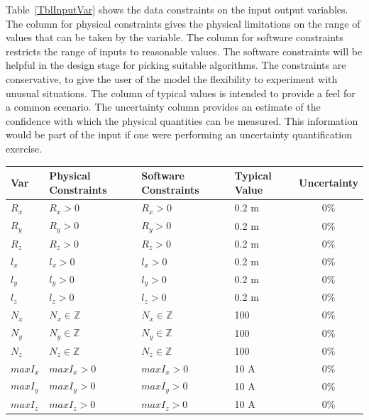 \documentclass[12pt]{article}
\begin{document}
Table~\ref{TblInputVar} shows the data constraints on the input output
variables.  The column for physical constraints gives the physical limitations
on the range of values that can be taken by the variable.  The column for
software constraints restricts the range of inputs to reasonable values.  The
software constraints will be helpful in the design stage for picking suitable
algorithms.  The constraints are conservative, to give the user of the model the
flexibility to experiment with unusual situations.  The column of typical values
is intended to provide a feel for a common scenario.  The uncertainty column
provides an estimate of the confidence with which the physical quantities can be
measured.  This information would be part of the input if one were performing an
uncertainty quantification exercise.


\begin{table}[H]
  \caption{Input Variables} \label{TblInputVar}
  \renewcommand{\arraystretch}{1.2}
\noindent \begin{longtable*}{l l l l c} 
  \toprule
  \textbf{Var} & \textbf{Physical Constraints} & \textbf{Software Constraints} &
                             \textbf{Typical Value} & \textbf{Uncertainty}\\
  \midrule 

  $R_x$ & $R_x > 0$ & $R_x > 0$ & 0.2 \si{\metre} & 0\% \\
  $R_y$ & $R_y > 0$ & $R_y > 0$ & 0.2 \si{\metre} & 0\% \\
  $R_z$ & $R_z > 0$ & $R_z > 0$ & 0.2 \si{\metre} & 0\% \\
  $l_x$ & $l_x > 0$ & $l_x > 0$ & 0.2 \si{\metre} & 0\% \\
  $l_y$ & $l_y > 0$ & $l_y > 0$ & 0.2 \si{\metre} & 0\% \\
  $l_z$ & $l_z > 0$ & $l_z > 0$ & 0.2 \si{\metre} & 0\% \\
  $N_x$ & $N_x \in \mathbb{Z}$ & $N_x \in \mathbb{Z}$ & 100 & 0\% \\
  $N_y$ & $N_y \in \mathbb{Z}$ &  $N_y \in \mathbb{Z}$ & 100 & 0\% \\
  $N_z$ & $N_z \in \mathbb{Z}$ & $N_z \in \mathbb{Z}$ & 100 & 0\% \\
  $maxI_x$ & $maxI_x > 0$ & $maxI_x > 0$  & 10 \si{\ampere} & 0\% \\
  $maxI_y$ &  $maxI_y > 0$ &  $maxI_y > 0$ & 10 \si{\ampere} & 0\% \\
  $maxI_z$ &  $maxI_z > 0$ &$maxI_z > 0$ & 10 \si{\ampere} & 0\% \\

  \bottomrule
\end{longtable*}
\end{table}
\end{document}

